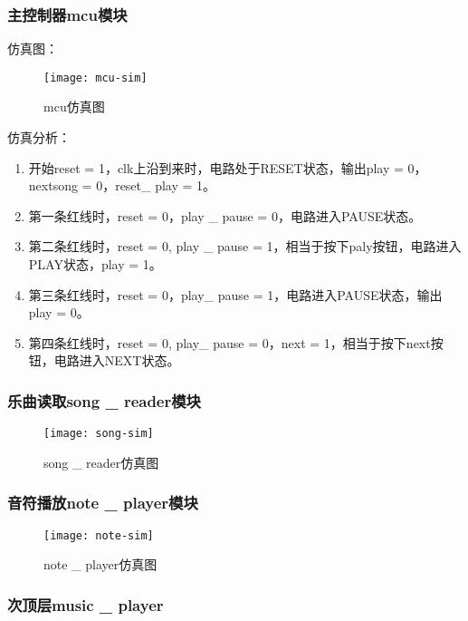 \documentclass{../source/Experiment}
\begin{document}
            \subsubsection{主控制器mcu模块}
            仿真图：
                \begin{figure}[H]
                    \centering
                    \texttt{[image: mcu-sim]}
                    \caption{mcu仿真图}
                \end{figure}
            仿真分析：

            \begin{enumerate}
                \item 开始reset = 1，clk上沿到来时，电路处于RESET状态，输出play = 0，nextsong = 0，reset\_ play = 1。 
                \item 第一条红线时，reset = 0，play \_ pause = 0，电路进入PAUSE状态。
                \item 第二条红线时，reset = 0, play \_ pause = 1，相当于按下paly按钮，电路进入PLAY状态，play = 1。 
                \item 第三条红线时，reset = 0，play\_ pause = 1，电路进入PAUSE状态，输出play = 0。 
                \item 第四条红线时，reset = 0, play\_ pause = 0，next = 1，相当于按下next按钮，电路进入NEXT状态。
            \end{enumerate}

            \subsubsection{乐曲读取song \_ reader模块}
                \begin{figure}[H]
                    \centering
                    \texttt{[image: song-sim]}
                    \caption{song \_ reader仿真图}
                \end{figure}
            \subsubsection{音符播放note \_ player模块}
                \begin{figure}[H]
                    \centering
                    \texttt{[image: note-sim]}
                    \caption{note \_ player仿真图}
                \end{figure}
            \subsubsection{次顶层music \_ player}
\end{document}
